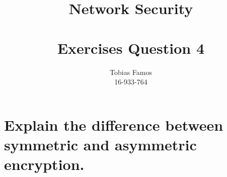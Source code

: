 \documentclass[11pt,a4paper]{article}
\title{Network Security \\ ~\\ \Large{Exercises Question 4}}
\author{Tobias Famos\\ 16-933-764}
\begin{document}
    \maketitle
    \section*{Explain the difference between symmetric and asymmetric encryption.}
\end{document}
